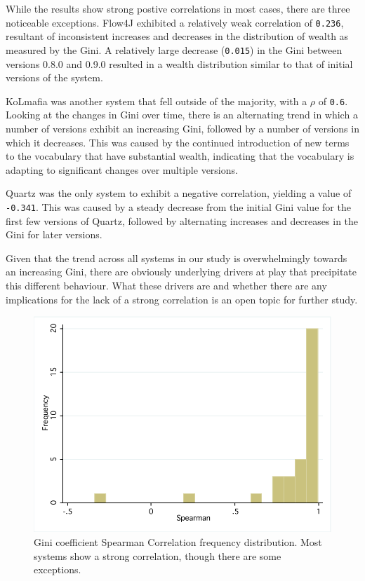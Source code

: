 While the results show strong postive correlations in most cases, there are three noticeable exceptions. Flow4J exhibited a relatively weak correlation of \texttt{0.236}, resultant of inconsistent increases and decreases in the distribution of wealth as measured by the Gini. A relatively large decrease (\texttt{0.015}) in the Gini between versions 0.8.0 and 0.9.0 resulted in a wealth distribution similar to that of initial versions of the system.

KoLmafia was another system that fell outside of the majority, with a $\rho$ of \texttt{0.6}. Looking at the changes in Gini over time, there is an alternating trend in which a number of versions exhibit an increasing Gini, followed by a number of versions in which it decreases. This was caused by the continued introduction of new terms to the vocabulary that have substantial wealth, indicating that the vocabulary is adapting to significant changes over multiple versions.

Quartz was the only system to exhibit a negative correlation, yielding a value of \texttt{-0.341}. This was caused by a steady decrease from the initial Gini value for the first few versions of Quartz, followed by alternating increases and decreases in the Gini for later versions.

Given that the trend across all systems in our study is overwhelmingly towards an increasing Gini, there are obviously underlying drivers at play that precipitate this different behaviour. What these drivers are and whether there are any implications for the lack of a strong correlation is an open topic for further study.

\begin{figure}[t]
\centering
\includegraphics[width=\textwidth]{Figures/Vocab-GiniSpearmanFreqDist.pdf}
\caption{Gini coefficient Spearman Correlation frequency distribution. Most systems show a strong correlation, though there are some exceptions.}
\label{fig:vocab-gini-spearman}
\end{figure}

